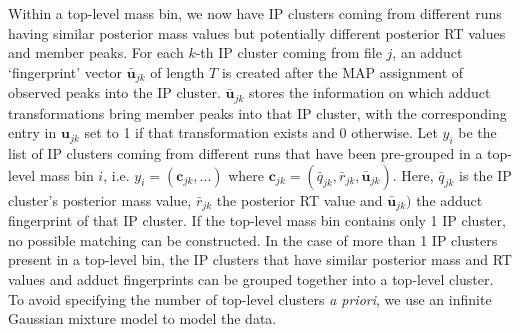 Within a top-level mass bin, we now have IP clusters coming from different runs having similar posterior mass values but potentially different posterior RT values and member peaks. For each $k$-th IP cluster coming from file $j$, an adduct `fingerprint' vector $\boldsymbol{\bar{u}}_{jk}$ of length $T$ is created after the MAP assignment of observed peaks into the IP cluster. $\boldsymbol{\bar{u}}_{jk}$ stores the information on which adduct transformations bring member peaks into that IP cluster, with the corresponding entry in $\boldsymbol{u}_{jk}$ set to 1 if that transformation exists and 0 otherwise. Let $y_i$ be the list of IP clusters coming from different runs that have been pre-grouped in a top-level mass bin $i$, i.e. $y_i=(\boldsymbol{c}_{jk},...)$ where $\boldsymbol{c}_{jk}=({\bar{q}}_{jk}, {\bar{r}}_{jk}, \boldsymbol{\bar{u}}_{jk})$. Here, ${\bar{q}}_{jk}$ is the IP cluster's posterior mass value, ${\bar{r}}_{jk}$ the posterior RT value and $\boldsymbol{\bar{u}}_{jk})$ the adduct fingerprint of that IP cluster. If the top-level mass bin contains only 1 IP cluster, no possible matching can be constructed. In the case of more than 1 IP clusters present in a top-level bin, the IP clusters that have similar posterior mass and RT values and adduct fingerprints can be grouped together into a top-level cluster. To avoid specifying the number of top-level clusters \textit{a priori}, we use an infinite Gaussian mixture model \cite{Rasmussen2000} to model the data. 

